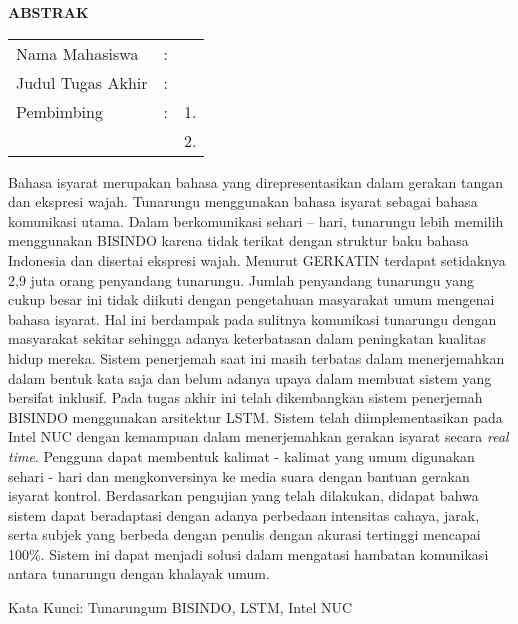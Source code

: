 \begin{center}
  \large\textbf{ABSTRAK}
\end{center}


\vspace{2ex}

\begingroup
\setlength{\tabcolsep}{0pt}

\noindent
\begin{tabularx}{\textwidth}{l >{\centering}m{2em} X}
  Nama Mahasiswa    & : & \name{}         \\

  Judul Tugas Akhir & : & \tatitle{}      \\

  Pembimbing        & : & 1. \advisor{}   \\
                    &   & 2. \coadvisor{} \\
\end{tabularx} 
\endgroup

Bahasa isyarat merupakan bahasa yang direpresentasikan dalam gerakan tangan dan ekspresi wajah. Tunarungu menggunakan bahasa isyarat sebagai bahasa komunikasi utama. Dalam berkomunikasi sehari – hari, tunarungu lebih memilih menggunakan BISINDO karena tidak terikat dengan struktur baku bahasa Indonesia dan disertai ekspresi wajah. Menurut GERKATIN terdapat setidaknya 2,9 juta orang penyandang tunarungu. Jumlah penyandang tunarungu yang cukup besar ini tidak diikuti dengan pengetahuan masyarakat umum mengenai bahasa isyarat. Hal ini berdampak pada sulitnya komunikasi tunarungu dengan masyarakat sekitar sehingga adanya keterbatasan dalam peningkatan kualitas hidup mereka. Sistem penerjemah saat ini masih terbatas dalam menerjemahkan dalam bentuk kata saja dan belum adanya upaya dalam membuat sistem yang bersifat inklusif. Pada tugas akhir ini telah dikembangkan sistem penerjemah BISINDO menggunakan arsitektur LSTM. Sistem telah diimplementasikan pada Intel NUC dengan kemampuan dalam menerjemahkan gerakan isyarat secara \emph{real time}. Pengguna dapat membentuk kalimat - kalimat yang umum digunakan sehari - hari dan mengkonversinya ke media suara dengan bantuan gerakan isyarat kontrol. Berdasarkan pengujian yang telah dilakukan, didapat bahwa sistem dapat beradaptasi dengan adanya perbedaan intensitas cahaya, jarak, serta subjek yang berbeda dengan penulis dengan akurasi tertinggi mencapai 100\%. Sistem ini dapat menjadi solusi dalam mengatasi hambatan komunikasi antara tunarungu dengan khalayak umum.

Kata Kunci: Tunarungum BISINDO, LSTM, Intel NUC
